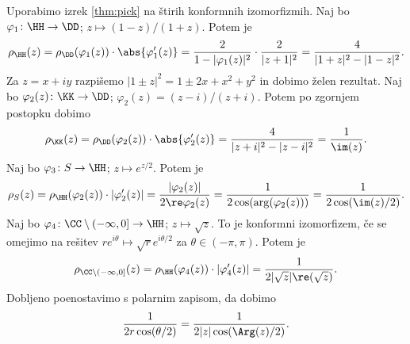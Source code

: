 \begin{dokaz}
    Uporabimo izrek \ref{thm:pick} na štirih konformnih izomorfizmih. Naj bo \(\varphi_1 \colon \HH \to \DD\); \(z \mapsto (1 - z) / (1 + z)\). Potem je
    \[\rho_{\HH} (z) = \rho_{\DD} (\varphi_1 (z)) \cdot \abs{\varphi_1' (z)} = \frac{2}{1 - |\varphi_1 (z)|^2} \cdot \frac{2}{|z + 1|^2} = \frac{4}{|1 + z|^2 - |1- z|^2}.\]
    Za \(z = x + i y\) razpišemo \(|1 \pm z|^2 = 1 \pm 2x + x^2 + y^2\) in dobimo želen rezultat. Naj bo \(\varphi_2 (z) \colon \KK \to \DD\); \(\varphi_2 (z) = (z - i) / (z + i)\). Potem po zgornjem postopku dobimo
    \[\rho_{\KK} (z) = \rho_{\DD} (\varphi_2 (z)) \cdot \abs{\varphi_2' (z)} = \frac{4}{|z + i|^2 - |z - i|^2} = \frac{1}{\im (z)}.\]
    Naj bo \(\varphi_3 \colon S \to \HH\); \(z \mapsto e^{z / 2}\). Potem je
    \[\rho_S (z) = \rho_{\HH} (\varphi_2 (z)) \cdot |\varphi_2' (z)| = \frac{|\varphi_2 (z)|}{2 \re \varphi_2 (z)} = \frac{1}{2 \cos (\arg (\varphi_2 (z)))} = \frac{1}{2 \cos (\im (z) / 2)}.\]
    Naj bo \(\varphi_4 \colon \CC \setminus (- \infty, 0] \to \HH\); \(z \mapsto \sqrt{z}\). To je konformni izomorfizem, če se omejimo na rešitev \(r e^{i \theta} \mapsto \sqrt{r} e^{i \theta / 2}\) za \(\theta \in (- \pi, \pi)\). Potem je
    \[\rho_{\CC \setminus (- \infty, 0]} (z) = \rho_{\HH} (\varphi_4 (z)) \cdot |\varphi_4' (z)| = \frac{1}{2 |\sqrt{z}| \re (\sqrt{z})}.\]
    Dobljeno poenostavimo s polarnim zapisom, da dobimo
    \[\frac{1}{2 r \cos (\theta / 2)} = \frac{1}{2 |z| \cos (\Arg (z) / 2)}.\]
\end{dokaz}
